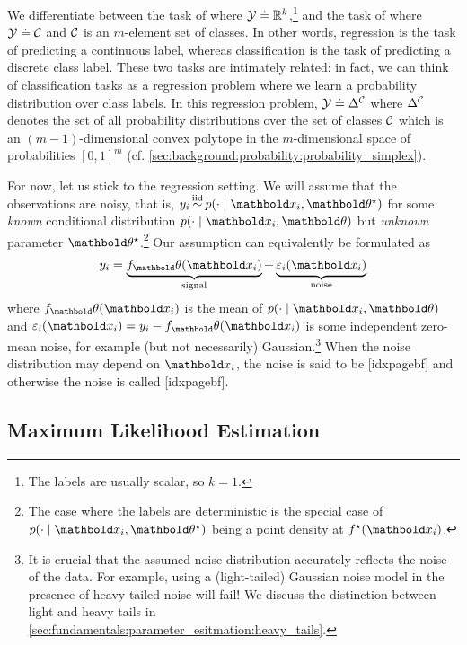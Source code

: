 We differentiate between the task of  where ${\mathcal{Y} \overset{.}{=} \mathbb{R}^k}$,\footnote{The labels are usually scalar, so ${k = 1}$.} and the task of  where ${\mathcal{Y} \overset{.}{=} \mathcal{C}}$ and $\mathcal{C}$ is an $m$-element set of classes.
In other words, regression is the task of predicting a continuous label, whereas classification is the task of predicting a discrete class label.
These two tasks are intimately related: in fact, we can think of classification tasks as a regression problem where we learn a probability distribution over class labels.
In this regression problem, ${\mathcal{Y} \overset{.}{=} \Delta^{\mathcal{C}}}$ where $\Delta^{\mathcal{C}}$ denotes the set of all probability distributions over the set of classes $\mathcal{C}$ which is an ${(m-1)}$-dimensional convex polytope in the $m$-dimensional space of probabilities $[0,1]^m$ (cf. \cref{sec:background:probability:probability_simplex}).

For now, let us stick to the regression setting.
We will assume that the observations are noisy, that is, $y_i \iid p(\cdot \mid \vx_i, \opt{\vtheta})$ for some \emph{known} conditional distribution $p(\cdot \mid \vx_i, \vtheta)$ but \emph{unknown} parameter $\opt{\vtheta}$.\footnote{The case where the labels are deterministic is the special case of $p(\cdot \mid \vx_i, \opt{\vtheta})$ being a point density at $\fs(\vx_i)$.}
Our assumption can equivalently be formulated as \begin{align}
  y_i = \underbrace{f_\vtheta(\vx_i)}_{\text{signal}} + \underbrace{\varepsilon_i(\vx_i)}_{\text{noise}} \label{eq:data}
\end{align} where $f_\vtheta(\vx_i)$ is the mean of $p(\cdot \mid \vx_i, \vtheta)$ and $\varepsilon_i(\vx_i) = y_i - f_\vtheta(\vx_i)$ is some independent zero-mean noise, for example (but not necessarily) Gaussian.\footnote{It is crucial that the assumed noise distribution accurately reflects the noise of the data. For example, using a (light-tailed) Gaussian noise model in the presence of heavy-tailed noise will fail! We discuss the distinction between light and heavy tails in \cref{sec:fundamentals:parameter_esitmation:heavy_tails}.}
When the noise distribution may depend on $\vx_i$, the noise is said to be [idxpagebf] and otherwise the noise is called [idxpagebf].

\subsection{Maximum Likelihood Estimation}\label{sec:fundamentals:parameter_estimation:mle}

